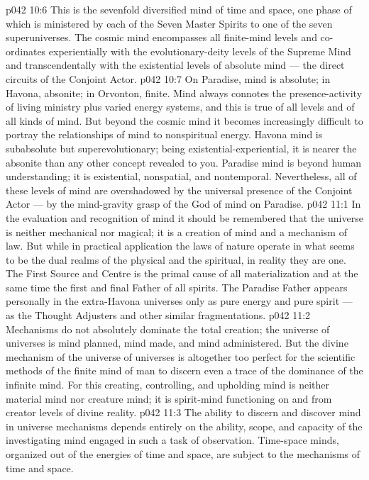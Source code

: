 \vs p042 10:6 \pc {} This is the sevenfold diversified mind of time and space, one phase of which is ministered by each of the Seven Master Spirits to one of the seven superuniverses. The cosmic mind encompasses all finite\hyp{}mind levels and co\hyp{}ordinates experientially with the evolutionary\hyp{}deity levels of the Supreme Mind and transcendentally with the existential levels of absolute mind --- the direct circuits of the Conjoint Actor.
\vs p042 10:7 On Paradise, mind is absolute; in Havona, absonite; in Orvonton, finite. Mind always connotes the presence\hyp{}activity of living ministry plus varied energy systems, and this is true of all levels and of all kinds of mind. But beyond the cosmic mind it becomes increasingly difficult to portray the relationships of mind to nonspiritual energy. Havona mind is subabsolute but superevolutionary; being existential\hyp{}experiential, it is nearer the absonite than any other concept revealed to you. Paradise mind is beyond human understanding; it is existential, nonspatial, and nontemporal. Nevertheless, all of these levels of mind are overshadowed by the universal presence of the Conjoint Actor --- by the mind\hyp{}gravity grasp of the God of mind on Paradise.
\vs p042 11:1 In the evaluation and recognition of mind it should be remembered that the universe is neither mechanical nor magical; it is a creation of mind and a mechanism of law. But while in practical application the laws of nature operate in what seems to be the dual realms of the physical and the spiritual, in reality they are one. The First Source and Centre is the primal cause of all materialization and at the same time the first and final Father of all spirits. The Paradise Father appears personally in the extra\hyp{}Havona universes only as pure energy and pure spirit --- as the Thought Adjusters and other similar fragmentations.
\vs p042 11:2 \pc Mechanisms do not absolutely dominate the total creation; the universe of universes  is mind planned, mind made, and mind administered. But the divine mechanism of the universe of universes is altogether too perfect for the scientific methods of the finite mind of man to discern even a trace of the dominance of the infinite mind. For this creating, controlling, and upholding mind is neither material mind nor creature mind; it is spirit\hyp{}mind functioning on and from creator levels of divine reality.
\vs p042 11:3 The ability to discern and discover mind in universe mechanisms depends entirely on the ability, scope, and capacity of the investigating mind engaged in such a task of observation. Time\hyp{}space minds, organized out of the energies of time and space, are subject to the mechanisms of time and space.
